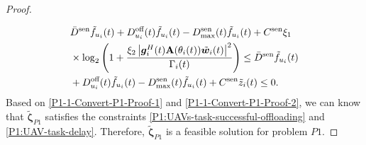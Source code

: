 \documentclass[10pt,journal,compsoc]{IEEEtran}
\newtheorem*{proof}{Proof}
\begin{document}
\begin{proof}
\begin{align}
    \end{align}
    \begin{align}\label{P1-1-Convert-P1-Proof-2}
        & \bar{D}^{\text{sen}}\tilde{f}_{u_{i}}(t) + D_{u_{i}}^{\text{off}}(t)\tilde{f}_{u_{i}}(t) - D^{\text{sen}}_{\max}(t)\tilde{f}_{u_{i}}(t) + C^{\text{sen}} \xi_{1} \notag \\
        & \times \log_2 \Bigg(1 + \frac{\xi_{2} \left|\bm{g}^{H}_{i}(t)\mathbf{A}(\theta_{i}(t)) \tilde{\bm{w}}_{i}(t)\right|^{2}}{\Gamma_{i}(t)}\Bigg)  \le \bar{D}^{\text{sen}}\tilde{f}_{u_{i}}(t) \notag \\
        & + D_{u_{i}}^{\text{off}}(t)\tilde{f}_{u_{i}}(t) - D^{\text{sen}}_{\max}(t)\tilde{f}_{u_{i}}(t) + C^{\text{sen}}\tilde{z}_{i}(t) \le 0.
    \end{align}
    Based on \eqref{P1-1-Convert-P1-Proof-1} and \eqref{P1-1-Convert-P1-Proof-2}, we can know that $\tilde{\bm{\zeta}}_{P1}$ satisfies the constraints \eqref{P1:UAVs-task-successful-offloading} and \eqref{P1:UAV-task-delay}. 
    Therefore, $\tilde{\bm{\zeta}}_{P1}$ is a feasible solution for problem $P1$.


\end{proof}
\end{document}
